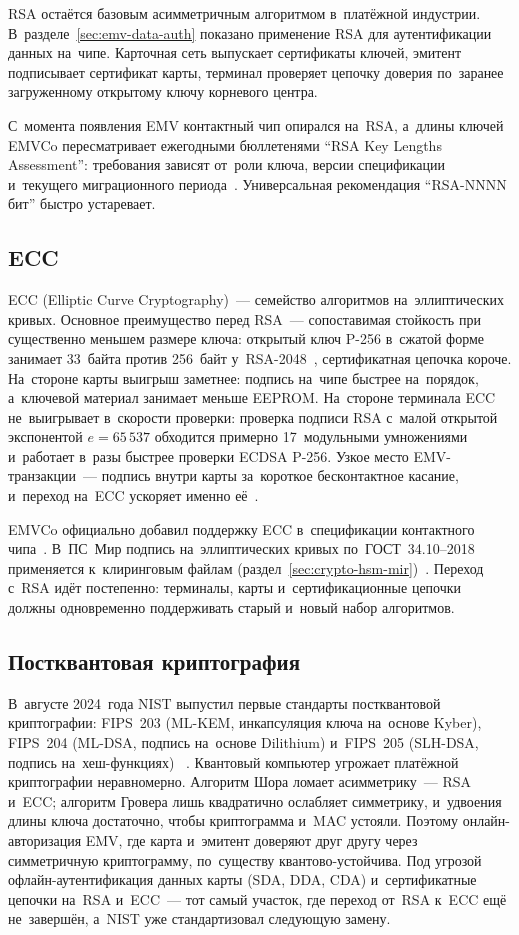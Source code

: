 RSA остаётся базовым асимметричным алгоритмом в~платёжной индустрии.
В~разделе~\ref{sec:emv-data-auth} показано применение RSA для аутентификации
данных на~чипе. Карточная сеть выпускает сертификаты ключей, эмитент
подписывает сертификат карты, терминал проверяет цепочку доверия по~заранее
загруженному открытому ключу корневого центра.

С~момента появления EMV контактный чип опирался на~RSA, а~длины ключей EMVCo
пересматривает ежегодными бюллетенями \enquote{RSA Key Lengths Assessment}:
требования зависят от~роли ключа, версии спецификации и~текущего миграционного
периода~\cite{emvco-ecc-faq,emvco-bulletins-archive}. Универсальная
рекомендация \enquote{RSA-NNNN бит} быстро устаревает.

\subsection*{ECC}

ECC (Elliptic Curve Cryptography)~--- семейство алгоритмов на~эллиптических
кривых. Основное преимущество перед RSA~--- сопоставимая стойкость при
существенно меньшем размере ключа: открытый ключ P-256 в~сжатой форме занимает 33~байта
против 256~байт у~RSA-2048~\cite{secg-sec1}, сертификатная цепочка короче. На~стороне карты
выигрыш заметнее: подпись на~чипе быстрее на~порядок, а~ключевой материал
занимает меньше EEPROM. На~стороне терминала ECC не~выигрывает в~скорости
проверки: проверка подписи RSA с~малой открытой экспонентой $e=65\,537$ обходится
примерно 17~модульными умножениями и~работает в~разы быстрее проверки
ECDSA P-256. Узкое место EMV-транзакции~--- подпись внутри карты за~короткое бесконтактное
касание, и~переход на~ECC ускоряет именно её~\cite{emvco-ecc-faq}.

EMVCo официально добавил поддержку ECC в~спецификации контактного чипа~\cite{emvco-ecc-faq}.
В~ПС~Мир подпись на~эллиптических кривых по~ГОСТ~34.10--2018 применяется
к~клиринговым файлам (раздел~\ref{sec:crypto-hsm-mir})~\cite{gost-34-10}. Переход
с~RSA идёт постепенно: терминалы, карты и~сертификационные цепочки должны одновременно поддерживать старый и~новый
набор алгоритмов.

\subsection*{Постквантовая криптография}

В~августе 2024~года NIST выпустил первые стандарты постквантовой криптографии:
FIPS~203 (ML-KEM, инкапсуляция ключа на~основе Kyber), FIPS~204 (ML-DSA, подпись
на~основе Dilithium) и~FIPS~205 (SLH-DSA, подпись на~хеш-функциях)%
~\cite{nist-fips-203,nist-fips-204,nist-fips-205}. Квантовый компьютер угрожает
платёжной криптографии неравномерно. Алгоритм Шора ломает асимметрику~--- RSA
и~ECC; алгоритм Гровера лишь квадратично ослабляет симметрику, и~удвоения длины
ключа достаточно, чтобы криптограмма и~MAC устояли. Поэтому онлайн-авторизация
EMV, где карта и~эмитент доверяют друг другу через симметричную криптограмму,
по~существу квантово-устойчива. Под угрозой
офлайн-аутентификация данных карты (SDA, DDA, CDA) и~сертификатные цепочки
на~RSA и~ECC~--- тот
самый участок, где переход от~RSA к~ECC ещё не~завершён, а~NIST уже
стандартизовал следующую замену.

